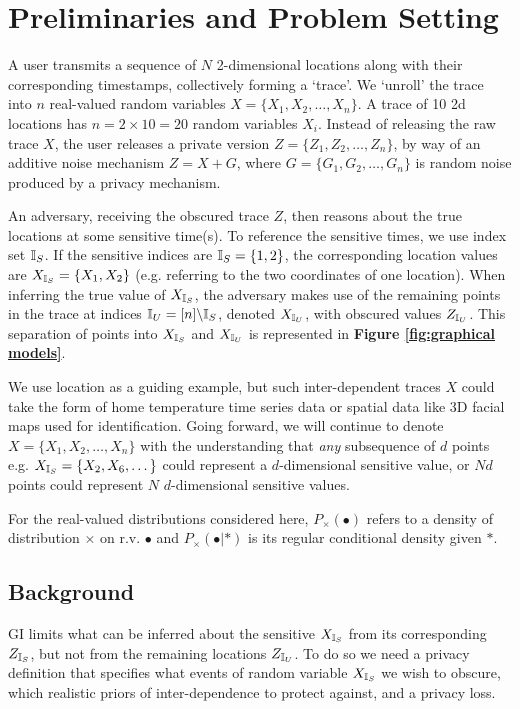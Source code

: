 \section{Preliminaries and Problem Setting}
\label{sec:preliminaries}
A user transmits a sequence of $N$ 2-dimensional locations along with their corresponding timestamps, collectively forming a `trace'. We `unroll' the trace into $n$ real-valued random variables $X = \{X_1, X_2, \dots, X_n\}$. A trace of 10 2d locations has $n = 2 \times 10 = 20$ random variables $X_i$. Instead of releasing the raw trace $X$, the user releases a private version $Z = \{Z_1, Z_2, \dots, Z_n\}$, by way of an additive noise mechanism $Z = X + G$, where $G = \{G_1,G_2, \dots, G_n\}$ is random noise produced by a privacy mechanism.

An adversary, receiving the obscured trace $Z$, then reasons about the true locations at some sensitive time(s). To reference the sensitive times, we use index set ${\mathbb{I}_S}$. If the sensitive indices are ${\mathbb{I}_S} = \{1,2\}$, the corresponding location values are ${X_{\mathbb{I}_S}} = \{X_{1}, X_{2}\}$ (e.g. referring to the two coordinates of one location). When inferring the true value of ${X_{\mathbb{I}_S}}$, the adversary makes use of the remaining points in the trace at indices $\mathbb{I}_U = [n] \backslash {\mathbb{I}_S}$, denoted ${X_{\mathbb{I}_U}}$, with obscured values ${Z_{\mathbb{I}_U}}$. This separation of points into ${X_{\mathbb{I}_S}}$ and ${X_{\mathbb{I}_U}}$ is represented in \textbf{Figure \ref{fig:graphical models}}. 

We use location as a guiding example, but such inter-dependent traces $X$ could take the form of home temperature time series data or spatial data like 3D facial maps used for identification. Going forward, we will continue to denote $X = \{X_1, X_2, \dots, X_n\}$ with the understanding that \emph{any} subsequence of $d$ points e.g. ${X_{\mathbb{I}_S}} = \{X_2, X_6, \dots\}$ could represent a $d$-dimensional sensitive value, or $Nd$ points could represent $N$ $d$-dimensional sensitive values. 

For the real-valued distributions considered here, $P_{\times}( \bullet )$ refers to a density of distribution $\times$ on r.v. $\bullet$ and $P_{\times}(\bullet | *)$ is its regular conditional density given $*$. 

\subsection{Background}
GI limits what can be inferred about the sensitive ${X_{\mathbb{I}_S}}$ from its corresponding ${Z_{\mathbb{I}_S}}$, but not from the remaining locations ${Z_{\mathbb{I}_U}}$. To do so we need a privacy definition that specifies what events of random variable ${X_{\mathbb{I}_S}}$ we wish to obscure, which realistic priors of inter-dependence to protect against, and a privacy loss. 


